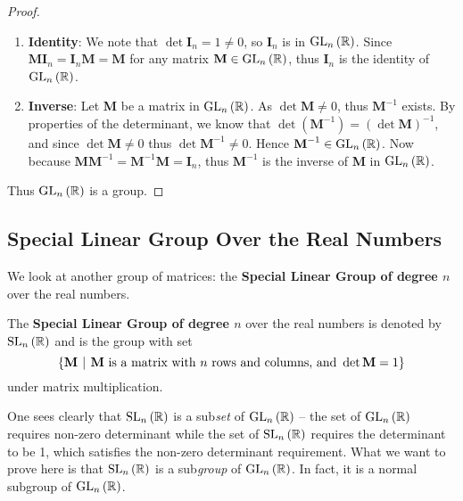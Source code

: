 \begin{proof}
\begin{enumerate}
        \item \textbf{Identity}: We note that $\det \textbf{I}_n = 1 \neq 0$, so $\textbf{I}_n$ is in $\mathrm{GL}_{n}\left(\mathbb{R}\right)$. Since $\textbf{MI}_n = \textbf{I}_n\textbf{M} = \textbf{M}$ for any matrix $\textbf{M} \in \mathrm{GL}_{n}\left(\mathbb{R}\right)$, thus $\textbf{I}_n$ is the identity of $\mathrm{GL}_{n}\left(\mathbb{R}\right)$.

        \item \textbf{Inverse}: Let \textbf{M} be a matrix in $\mathrm{GL}_{n}\left(\mathbb{R}\right)$. As $\det \textbf{M} \neq 0$, thus $\textbf{M}^{-1}$ exists. By properties of the determinant, we know that $\det \left(\textbf{M}^{-1}\right) = \left(\det \textbf{M}\right)^{-1}$, and since $\det \textbf{M} \neq 0$ thus $\det \textbf{M}^{-1} \neq 0$. Hence $\textbf{M}^{-1} \in \mathrm{GL}_{n}\left(\mathbb{R}\right)$. Now because $\textbf{MM}^{-1} = \textbf{M}^{-1}\textbf{M} = \textbf{I}_n$, thus $\textbf{M}^{-1}$ is the inverse of \textbf{M} in $\mathrm{GL}_{n}\left(\mathbb{R}\right)$.
    \end{enumerate}
    Thus $\mathrm{GL}_{n}\left(\mathbb{R}\right)$ is a group.
\end{proof}

\subsection{Special Linear Group Over the Real Numbers}
We look at another group of matrices: the \textbf{Special Linear Group of degree $n$} over the real numbers.

\begin{definition}
    The \textbf{Special Linear Group of degree $n$} over the real numbers is denoted by $\mathrm{SL}_{n}\left(\mathbb{R}\right)$ and is the group with set
    \[
        \left\{\textbf{M} \vert \text{\textbf{M} is a matrix with } n \text{ rows and columns, and } \det \textbf{M} = 1\right\}
    \]
    under matrix multiplication.
\end{definition}

One sees clearly that $\mathrm{SL}_{n}\left(\mathbb{R}\right)$ is a sub\textit{set} of $\mathrm{GL}_{n}\left(\mathbb{R}\right)$ -- the set of $\mathrm{GL}_{n}\left(\mathbb{R}\right)$ requires non-zero determinant while the set of $\mathrm{SL}_{n}\left(\mathbb{R}\right)$ requires the determinant to be 1, which satisfies the non-zero determinant requirement. What we want to prove here is that $\mathrm{SL}_{n}\left(\mathbb{R}\right)$ is a sub\textit{group} of $\mathrm{GL}_{n}\left(\mathbb{R}\right)$. In fact, it is a normal subgroup of $\mathrm{GL}_{n}\left(\mathbb{R}\right)$.

